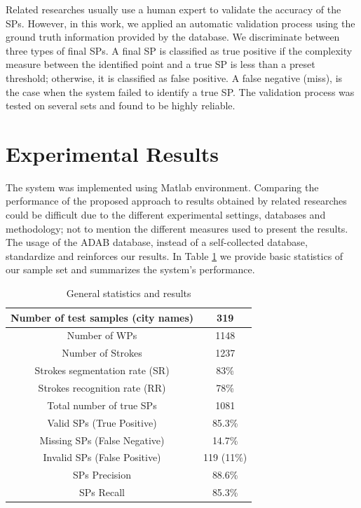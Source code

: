 \documentclass[10pt, conference, compsocconf]{IEEEtran}
\begin{document}
Related researches usually use a human expert to validate the accuracy of the SPs. However, in this work, we applied an automatic validation process using the ground truth information provided by the database. We discriminate between three types of final SPs. A final SP is classified as true positive if the complexity measure between the identified point and a true SP is less than a preset threshold; otherwise, it is classified as false positive. A false negative (miss), is the case when the system failed to identify a true SP.
The validation process was tested on several sets and found to be highly reliable.


\section{Experimental Results}
\label{sec:results}
The system was implemented using Matlab environment. 
Comparing the performance of the proposed approach to results obtained by related researches could be difficult due to the different experimental settings, databases and methodology; not to mention the different measures used to present the results. 
The usage of the ADAB database, instead of a self-collected database, standardize and reinforces our results. 
In Table \ref{table:general_stats_results} we provide basic statistics of our sample set and summarizes the system's performance.

\begin{table}[h]
\caption{General statistics and results}
\renewcommand{\arraystretch}{1.2}
\begin{tabular}{ | c | c | }
  \hline
  Number of test samples (city names) & 319 \\
  \hline
  Number of WPs & 1148 \\
  \hline
  Number of Strokes & 1237 \\
  \hline
  Strokes segmentation rate (SR) &  83\% \\ 
  \hline
  Strokes recognition rate (RR) &  78\% \\ 
 \hline
  Total number of true SPs & 1081 \\
  \hline
  Valid SPs (True Positive) & 85.3\% \\
    \hline
  Missing SPs (False Negative) & 14.7\% \\
  \hline
  Invalid SPs (False Positive) & 119 (11\%) \\
  \hline                                    
  SPs Precision & 88.6\% \\ 
 \hline
  SPs Recall &  85.3\% \\ 
  \hline
\end{tabular}
\centering
\label{table:general_stats_results} 
\end{table}
\end{document}
